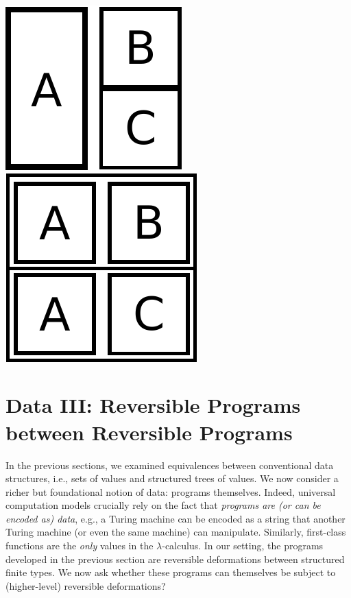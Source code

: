 \documentclass{article}
\begin{document}
\begin{center}
\qquad\qquad\qquad
\includegraphics[scale=0.3]{images/distrib-1}
\qquad
\includegraphics[scale=0.3]{images/distrib-2}
\end{center}

\section{Data III: Reversible Programs between Reversible Programs}
\label{sec:pi2}

In the previous sections, we examined equivalences between
conventional data structures, i.e., sets of values and structured trees
of values. We now consider a richer but
foundational notion of data: programs themselves. Indeed, universal
computation models crucially rely on the fact that \emph{programs
are (or can be encoded as) data}, e.g., a Turing machine can be
encoded as a string that another Turing machine (or even the same
machine) can manipulate. Similarly, first-class functions are
the \emph{only} values in the $\lambda$-calculus.
In our setting, the programs developed in the
previous section are reversible deformations between structured finite
types. We now ask whether these programs can themselves
be subject to (higher-level) reversible deformations?
\end{document}
